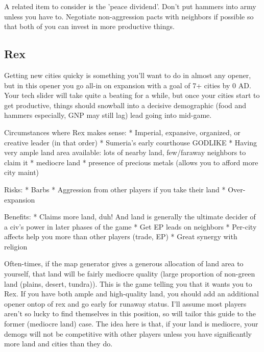 \documentclass[10pt]{article}
\begin{document}
A related item to consider is the 'peace dividend'. Don't put hammers into army unless you have to. Negotiate
non-aggression pacts with neighbors if possible so that both of you can invest in more productive things.

\subsection*{Rex}

Getting new cities quicky is something you'll want to do in almost any opener, but in this
opener you go all-in on expansion with a goal of 7+ cities by 0 AD. Your tech slider will take
quite a beating for a while, but once your cities start to get productive, things should snowball
into a decisive demographic (food and hammers especially, GNP may still lag) lead going into mid-game.

Circumstances where Rex makes sense:
* Imperial, expansive, organized, or creative leader (in that order)
* Sumeria's early courthouse GODLIKE
* Having very ample land area available: lots of nearby land, few/faraway neighbors to claim it
* mediocre land
* presence of precious metals (allows you to afford more city maint)

Risks:
* Barbs
* Aggression from other players if you take their land
* Over-expansion

Benefits:
* Claims more land, duh! And land is generally the ultimate decider of a civ's power in later phases of the game
* Get EP leads on neighbors
* Per-city affects help you more than other players (trade, EP)
* Great synergy with religion

Often-times, if the map generator gives a generous allocation of land
area to yourself, that land will be fairly mediocre quality (large
proportion of non-green land (plains, desert, tundra)).  This is the
game telling you that it wants you to Rex. If you have both ample and
high-quality land, you should add an additional opener ontop of rex
and go early for runaway status. I'll assume most players aren't so
lucky to find themselves in this position, so will tailor this guide
to the former (mediocre land) case.  The idea here is that, if your
land is mediocre, your demogs will not be competitive with other
players unless you have significantly more land and cities than they
do.
\end{document}
